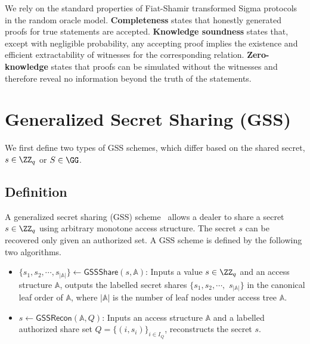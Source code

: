 \documentclass[runningheads]{llncs}
\newcommand{\gssshare}{\mathsf{GSSShare}}
\newcommand{\gssrecon}{\mathsf{GSSRecon}}
\begin{document}
We rely on the standard properties of Fiat-Shamir transformed Sigma protocols in the random oracle model. \textbf{Completeness} states that honestly generated proofs for true statements are accepted. \textbf{Knowledge soundness} states that, except with negligible probability, any accepting proof implies the existence and efficient extractability of witnesses for the corresponding relation. \textbf{Zero-knowledge} states that proofs can be simulated without the witnesses and therefore reveal no information beyond the truth of the statements.






\section{Generalized Secret Sharing (GSS)}
\label{sec:gss}
We first define two types of GSS schemes, which differ based on the shared secret, $s\in \ZZ_q$ or $S\in \GG$.
\subsection{Definition}
\begin{definition}[GSS]\label{def:GSS}
A generalized secret sharing (GSS) scheme~\cite{benaloh1990generalized} allows a dealer to share a secret $s\in\ZZ_q$ using arbitrary monotone access structure. The secret $s$ can be recovered only given an authorized set. A GSS scheme is defined by the following two algorithms.
\begin{itemize}
    \item $\{{s_1},{s_2},\cdots,{s_{|\mathbb{A}|}}\} \gets \gssshare(s, \mathbb{A})$: Inputs a value $s\in\ZZ_q$ and an access structure $\mathbb{A}$, outputs the labelled secret shares $\{{s_1},{s_2},\cdots,$ ${s_{|\mathbb{A}|}}\}$ in the canonical leaf order of $\mathbb{A}$, where $|\mathbb{A}|$ is the number of leaf nodes under access tree $\mathbb{A}$.
    \item $s\gets \gssrecon(\mathbb{A}, Q)$: Inputs an access structure $\mathbb{A}$ and a labelled authorized share set $Q=\{(i,s_i)\}_{i\in I_Q}$, reconstructs the secret $s$.
\end{itemize}
\end{definition}
\end{document}
